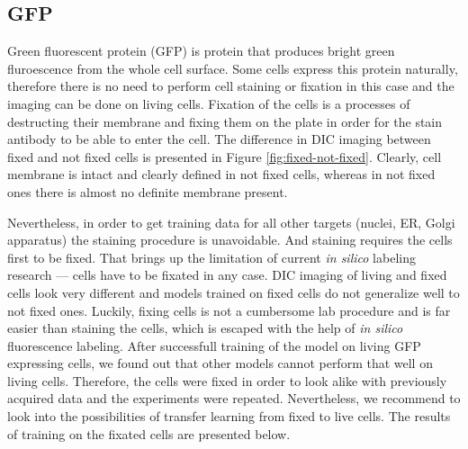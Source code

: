 \subsection{GFP}
    \label{section:gfp}
    Green fluorescent protein (GFP) is protein that produces bright green fluroescence from the whole cell surface. Some cells express this protein naturally, therefore there is no need to perform cell staining or fixation in this case and the imaging can be done on living cells. Fixation of the cells is a processes of destructing their membrane and fixing them on the plate in order for the stain antibody to be able to enter the cell. The difference in DIC imaging between fixed and not fixed cells is presented in Figure \ref{fig:fixed-not-fixed}. Clearly, cell membrane is intact and clearly defined in not fixed cells, whereas in not fixed ones there is almost no definite membrane present. 
    
    Nevertheless, in order to get training data for all other targets (nuclei, ER, Golgi apparatus) the staining procedure is unavoidable. And staining requires the cells first to be fixed. That brings up the limitation of current \textit{in silico} labeling research --- cells have to be fixated in any case. DIC imaging of living and fixed cells look very different and models trained on fixed cells do not generalize well to not fixed ones. Luckily, fixing cells is not a cumbersome lab procedure and is far easier than staining the cells, which is escaped with the help of \textit{in silico} fluorescence labeling. After successfull training of the model on living GFP expressing cells, we found out that other models cannot perform that well on living cells. Therefore, the cells were fixed in order to look alike with previously acquired data and the experiments were repeated. Nevertheless, we recommend to look into the possibilities of transfer learning from fixed to live cells. The results of training on the fixated cells are presented below. 
    
